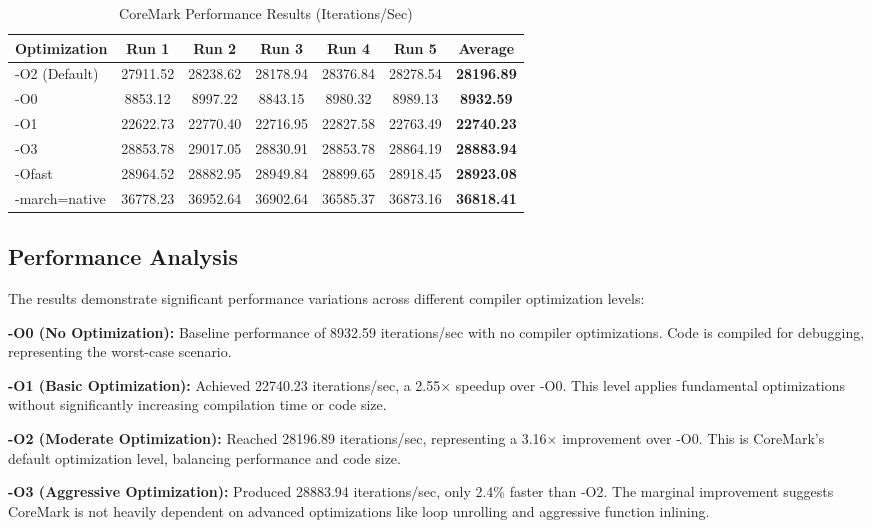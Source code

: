 \documentclass[11pt,a4paper]{article}
\begin{document}
\begin{table}[H]
\centering
\caption{CoreMark Performance Results (Iterations/Sec)}
\label{tab:results}
\small
\begin{tabular}{@{}lcccccc@{}}
\toprule
\textbf{Optimization} & \textbf{Run 1} & \textbf{Run 2} & \textbf{Run 3} & \textbf{Run 4} & \textbf{Run 5} & \textbf{Average} \\
\midrule
-O2 (Default) & 27911.52 & 28238.62 & 28178.94 & 28376.84 & 28278.54 & \textbf{28196.89} \\
-O0 & 8853.12 & 8997.22 & 8843.15 & 8980.32 & 8989.13 & \textbf{8932.59} \\
-O1 & 22622.73 & 22770.40 & 22716.95 & 22827.58 & 22763.49 & \textbf{22740.23} \\
-O3 & 28853.78 & 29017.05 & 28830.91 & 28853.78 & 28864.19 & \textbf{28883.94} \\
-Ofast & 28964.52 & 28882.95 & 28949.84 & 28899.65 & 28918.45 & \textbf{28923.08} \\
-march=native & 36778.23 & 36952.64 & 36902.64 & 36585.37 & 36873.16 & \textbf{36818.41} \\
\bottomrule
\end{tabular}
\end{table}

\subsection{Performance Analysis}

The results demonstrate significant performance variations across different compiler optimization levels:

\textbf{-O0 (No Optimization):} Baseline performance of 8932.59 iterations/sec with no compiler optimizations. Code is compiled for debugging, representing the worst-case scenario.

\textbf{-O1 (Basic Optimization):} Achieved 22740.23 iterations/sec, a 2.55× speedup over -O0. This level applies fundamental optimizations without significantly increasing compilation time or code size.

\textbf{-O2 (Moderate Optimization):} Reached 28196.89 iterations/sec, representing a 3.16× improvement over -O0. This is CoreMark's default optimization level, balancing performance and code size.

\textbf{-O3 (Aggressive Optimization):} Produced 28883.94 iterations/sec, only 2.4\% faster than -O2. The marginal improvement suggests CoreMark is not heavily dependent on advanced optimizations like loop unrolling and aggressive function inlining.
\end{document}
